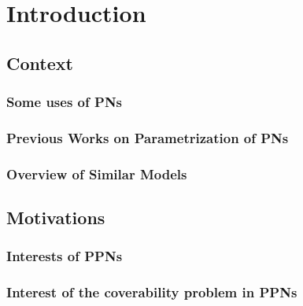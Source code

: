 \documentclass[11pt,a4paper,oneside]{book}
\theoremstyle{plain}
\theoremstyle{definition}
\theoremstyle{remark}
\begin{document}
\thispagestyle{empty} 
\setcounter{page}{0}
\tableofcontents
\acresetall

\mainmatter
\setcounter{page}{1}

\chapter{Introduction}
\label{sec:introduction}


%
\section{Context}
\label{sec:context}

\subsection{Some uses of \acp{PN}}
\label{sec:some-uses-of-pn}


\subsection{Previous Works on Parametrization of \acp{PN}}
\label{sec:previous-works-on-parametrization-of-pn}


\subsection{Overview of Similar Models}
\label{sec:overview-of-similar-models}


%
\section{Motivations}
\label{sec:motivations}

\subsection{Interests of \acp{PPN}}
\label{sec:interests-of-ppn}


\subsection{Interest of the coverability problem in \acp{PPN}}
\label{sec:interest-of-the-coverability-problem-in-ppn}

\end{document}
